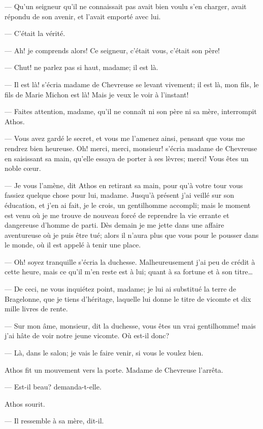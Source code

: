 — Qu'un seigneur qu'il ne connaissait pas avait bien voulu s'en charger, avait répondu de son avenir, et l'avait emporté avec lui.

— C'était la vérité.

— Ah! je comprends alors! Ce seigneur, c'était vous, c'était son père!

— Chut! ne parlez pas si haut, madame; il est là.

— Il est là! s'écria madame de Chevreuse se levant vivement; il est là, mon fils, le fils de Marie Michon est là! Mais je veux le voir à l'instant!

— Faites attention, madame, qu'il ne connaît ni son père ni sa mère, interrompit Athos.

— Vous avez gardé le secret, et vous me l'amenez ainsi, pensant que vous me rendrez bien heureuse. Oh! merci, merci, monsieur! s'écria madame de Chevreuse en saisissant sa main, qu'elle essaya de porter à ses lèvres; merci! Vous êtes un noble cœur.

— Je vous l'amène, dit Athos en retirant sa main, pour qu'à votre tour vous fassiez quelque chose pour lui, madame. Jusqu'à présent j'ai veillé sur son éducation, et j'en ai fait, je le crois, un gentilhomme accompli; mais le moment est venu où je me trouve de nouveau forcé de reprendre la vie errante et dangereuse d'homme de parti. Dès demain je me jette dans une affaire aventureuse où je puis être tué; alors il n'aura plus que vous pour le pousser dans le monde, où il est appelé à tenir une place.

— Oh! soyez tranquille s'écria la duchesse. Malheureusement j'ai peu de crédit à cette heure, mais ce qu'il m'en reste est à lui; quant à sa fortune et à son titre\dots

— De ceci, ne vous inquiétez point, madame; je lui ai substitué la terre de Bragelonne, que je tiens d'héritage, laquelle lui donne le titre de vicomte et dix mille livres de rente.

— Sur mon âme, monsieur, dit la duchesse, vous êtes un vrai gentilhomme! mais j'ai hâte de voir notre jeune vicomte. Où est-il donc?

— Là, dans le salon; je vais le faire venir, si vous le voulez bien.

Athos fit un mouvement vers la porte. Madame de Chevreuse l'arrêta.

— Est-il beau? demanda-t-elle.

Athos sourit.

— Il ressemble à sa mère, dit-il.

